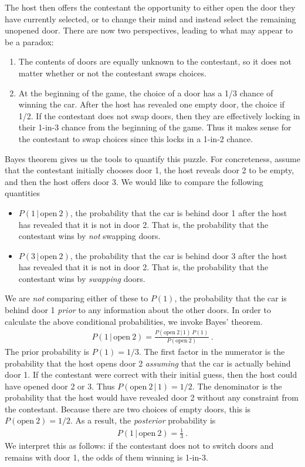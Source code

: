The host then offers the contestant the opportunity to either open the door they have currently selected, or to change their mind and instead select the remaining unopened door. There are now two perspectives, leading to what may appear to be a paradox:
\begin{enumerate}
	\item The contents of doors are equally unknown to the contestant, so it does not matter whether or not the contestant swaps choices.
	\item At the beginning of the game, the choice of a door has a 1/3 chance of winning the car. After the host has revealed one empty door, the choice if 1/2. If the contestant does not swap doors, then they are effectively locking in their 1-in-3 chance from the beginning of the game. Thus it makes sense for the contestant to swap choices since this locks in a 1-in-2 chance.
\end{enumerate}
Bayes theorem gives us the tools to quantify this puzzle. For concreteness, assume that the contestant initially chooses door 1, the host reveals door 2 to be empty, and then the host offers door 3. We would like to compare the following quantities
\begin{itemize}
	\item $P(1\,|\,\text{open}~2)$, the probability that the car is behind door 1 after the host has revealed that it is not in door 2. That is, the probability that the contestant wins by \emph{not} swapping doors.
	\item $P(3\,|\,\text{open}~2)$, the probability that the car is behind door 3 after the host has revealed that it is not in door 2. That is, the probability that the contestant wins by \emph{swapping} doors.
\end{itemize}
We are \emph{not} comparing either of these to $P(1)$, the probability that the car is behind door 1 \emph{prior} to any information about the other doors. In order to calculate the above conditional probabilities, we invoke Bayes' theorem.
\begin{align}
	P(1\,|\,\text{open}~2) = \frac{P(\text{open}~2\,|\,1)\, P(1)}{P(\text{open}~2)} \ .
\end{align}
The prior probability is $P(1)=1/3$. The first factor in the numerator is the probability that the host opens door 2 \emph{assuming} that the car is actually behind door 1. If the contestant were correct with their initial guess, then the host could have opened door 2 or 3. Thus $P(\text{open}~2\,|\,1)=1/2$. The denominator is the probability that the host would have revealed door 2 without any constraint from the contestant. Because there are two choices of empty doors, this is  $P(\text{open}~2)=1/2$. As a result, the \emph{posterior} probability is
\begin{align}
	P(1\,|\,\text{open}~2) = \frac{1}{3} \ .
\end{align}
We interpret this as follows: if the contestant does not to switch doors and remains with door 1, the odds of them winning is 1-in-3. 

